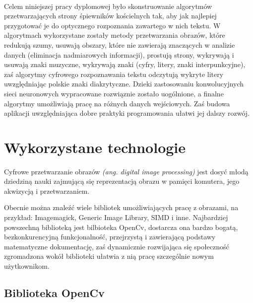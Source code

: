 \documentclass[a4paper,12pt]{article}
\begin{document}
			\paragraph{\indent} Celem niniejszej pracy dyplomowej było skonstruowanie algorytmów przetwarzających strony śpiewników kościelnych tak, 
				aby jak najlepiej przygotować je do optycznego rozpoznania zawartego w nich tekstu. W algorytmach wykorzystane zostały metody przetwarzania obrazów, 
				które redukują szumy, usuwają obszary, które nie zawierają znaczących w analizie danych (eliminacja nadmiarowych informacji), 
				prostują strony, wykrywają i usuwają znaki muzyczne, wykrywają znaki (cyfry, litery, znaki interpunkcyjne), 
				zaś algorytmy cyfrowego rozpoznawania tekstu odczytują wykryte litery uwzględniając polskie znaki diakrytyczne. 
				Dzieki zastosowaniu konwolucyjnych sieci neuronowych wypracowane rozwiąznie zostało uogólnione, a finalne algorytmy umożliwiają pracę 
				na różnych danych wejściowych. Zaś budowa aplikacji uwzględniająca dobre praktyki programowania ułatwi jej dalszy rozwój. 
	\newpage 

	\section{Wykorzystane technologie}
	    \paragraph{\indent} Cyfrowe przetwarzanie obrazów \textit{(ang. digital image processing)} jest dosyć młodą dziedziną nauki 
			zajmującą się reprezentacją obrazu w pamięci komutera, jego akwizycją i przetwarzaniem. 
        \par Obecnie można znaleźć wiele bibliotek umożliwiających pracę z obrazami, na przykład: Imagemagick, Generic Image Library, SIMD i inne. 
			Najbardziej powszechną biblioteką jest bilbioteka OpenCv, dostarcza ona bardzo bogatą, bezkonkurencyjną funkcjonalność, przejrzystą 
			i zawierającą podstawy matematyczne dokumentację, zaś dynamicznie rozwijająca się społeczność zgromadzona wokół biblioteki ułatwia 
			z nią pracę szczególnie nowym użytkownikom.
	    
		\subsection{Biblioteka OpenCv}
\end{document}
